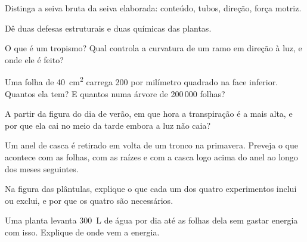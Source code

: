 \begin{exercise}[$\star$]\label{exo:g12:plant-rooted-life:3}
Distinga a seiva bruta da seiva elaborada: conteúdo, tubos, direção,
força motriz.
\end{exercise}

\begin{exercise}[$\star$]\label{exo:g12:plant-rooted-life:4}
Dê duas defesas estruturais e duas químicas das plantas.
\end{exercise}

\begin{exercise}[$\star$]\label{exo:g12:plant-rooted-life:5}
O que é um tropismo? Qual  controla a curvatura de um ramo em
direção à luz, e onde ele é feito?
\end{exercise}

\begin{exercise}[$\star\star$]\label{exo:g12:plant-rooted-life:6}
Uma folha de \qty{40}{cm^2} carrega 200  por milímetro
quadrado na face inferior. Quantos  ela tem? E quantos numa
árvore de 200\,000 folhas?
\end{exercise}

\begin{exercise}[$\star\star$]\label{exo:g12:plant-rooted-life:7}
A partir da figura do dia de verão, em que hora a transpiração é a mais
alta, e por que ela cai no meio da tarde embora a luz não caia?
\end{exercise}

\begin{exercise}[$\star\star$]\label{exo:g12:plant-rooted-life:8}
Um anel de casca é retirado em volta de um tronco na primavera. Preveja
o que acontece com as folhas, com as raízes e com a casca logo acima do
anel ao longo dos meses seguintes.
\end{exercise}

\begin{exercise}[$\star\star$]\label{exo:g12:plant-rooted-life:9}
Na figura das plântulas, explique o que cada um dos quatro experimentos
inclui ou exclui, e por que os quatro são necessários.
\end{exercise}

\begin{exercise}[$\star\star$]\label{exo:g12:plant-rooted-life:10}
Uma planta levanta \qty{300}{L} de água por dia até as folhas dela sem
gastar energia com isso. Explique de onde vem a energia.
\end{exercise}

